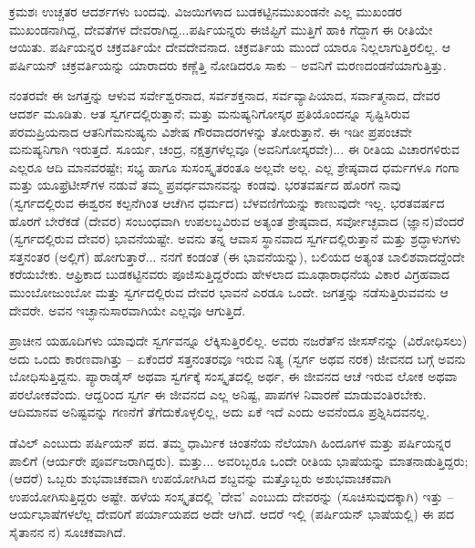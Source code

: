 \vskip 4pt

ಕ್ರಮಶಃ ಉಚ್ಚತರ ಆದರ್ಶಗಳು ಬಂದವು. ವಿಜಯಿಗಳಾದ ಬುಡಕಟ್ಟಿನ\break ಮುಖಂಡನೇ ಎಲ್ಲ ಮುಖಂಡರ ಮುಖಂಡನಾಗಿದ್ದ, ದೇವತೆಗಳ ದೇವರಾಗಿದ್ದ...\break ಪರ್ಷಿಯನ್ನರು ಈಜಿಪ್ಟಿಗೆ ಮುತ್ತಿಗೆ ಹಾಕಿ ಗೆದ್ದಾಗ ಈ ರೀತಿಯೇ ಆಯಿತು. ಪರ್ಷಿಯನ್ನರ ಚಕ್ರವರ್ತಿಯೇ ದೇವದೇವನಾದ. ಚಕ್ರವರ್ತಿಯ ಮುಂದೆ ಯಾರೂ ನಿಲ್ಲಲಾಗುತ್ತಿರಲಿಲ್ಲ. ಆ ಪರ್ಷಿಯನ್ ಚಕ್ರವರ್ತಿಯನ್ನು ಯಾರಾದರು ಕಣ್ಣೆತ್ತಿ ನೋಡಿದರೂ ಸಾಕು – ಅವನಿಗೆ ಮರಣದಂಡನೆಯಾಗುತ್ತಿತ್ತು.

\vskip 4pt

ನಂತರವೇ ಈ ಜಗತ್ತನ್ನು ಆಳುವ ಸರ್ವೇಶ್ವರನಾದ, ಸರ್ವಶಕ್ತನಾದ, ಸರ್ವವ್ಯಾಪಿಯಾದ, ಸರ್ವಾತ್ಮನಾದ, ದೇವರ ಆದರ್ಶ ಮೂಡಿತು. ಆತ ಸ್ವರ್ಗದಲ್ಲಿರುತ್ತಾನೆ; ಮತ್ತು ಮನುಷ್ಯನಿಗೋಸ್ಕರ ಪ್ರತಿಯೊಂದನ್ನೂ ಸೃಷ್ಟಿಸಿರುವ ಪರಮಪ್ರಿಯನಾದ ಆತನಿಗೆ\break ಮನುಷ್ಯನು ವಿಶೇಷ ಗೌರವಾದರಗಳನ್ನು ತೋರುತ್ತಾನೆ. ಈ ಇಡೀ ಪ್ರಪಂಚವೇ ಮನುಷ್ಯನಿಗಾಗಿ ಇರುತ್ತದೆ. ಸೂರ್ಯ, ಚಂದ್ರ, ನಕ್ಷತ್ರಗಳೆಲ್ಲವೂ (ಅವನಿಗೋಸ್ಕರವೇ)... ಈ ರೀತಿಯ ವಿಚಾರಗಳಿರುವ ಎಲ್ಲರೂ ಆದಿ ಮಾನವರಷ್ಟೇ; ಸಭ್ಯ ಹಾಗೂ ಸುಸಂಸ್ಕೃತರಂತೂ ಅಲ್ಲವೇ ಅಲ್ಲ. ಎಲ್ಲ ಶ್ರೇಷ್ಠವಾದ ಧರ್ಮಗಳೂ ಗಂಗಾ ಮತ್ತು ಯೂಫ್ರೆಟೀಸ್‌ಗಳ ನಡುವೆ ತಮ್ಮ ಪ್ರವರ್ಧಮಾನವನ್ನು ಕಂಡವು. ಭರತವರ್ಷದ ಹೊರಗೆ ನಾವು (ಸ್ವರ್ಗದಲ್ಲಿರುವ ಈಶ್ವರನ ಕಲ್ಪನೆಗಿಂತ ಆಚೆಗಿನ ಧರ್ಮದ) ಬೆಳವಣಿಗೆಯನ್ನು ಕಾಣುವುದೇ ಇಲ್ಲ. ಭರತವರ್ಷದ ಹೊರಗೆ ಬೇರೆಕಡೆ (ದೇವರ) ಸಂಬಂಧವಾಗಿ ಉಪಲಬ್ಧವಿರುವ ಅತ್ಯಂತ ಶ್ರೇಷ್ಠವಾದ, ಸರ್ವೋಚ್ಛವಾದ (ಜ್ಞಾನ)ವೆಂದರೆ (ಸ್ವರ್ಗದಲ್ಲಿರುವ ದೇವರ) ಭಾವನೆಯಷ್ಟೇ. ಅವನು ತನ್ನ ಆವಾಸ ಸ್ಥಾನವಾದ ಸ್ವರ್ಗದಲ್ಲಿರುತ್ತಾನೆ ಮತ್ತು ಶ್ರದ್ಧಾಳುಗಳು ಸತ್ತನಂತರ (ಅಲ್ಲಿಗೆ) ಹೋಗುತ್ತಾರೆ... ನನಗೆ ಕಂಡಂತೆ (ಈ ಭಾವನೆಯನ್ನು), ಬಲಿಯದ ಅತ್ಯಂತ ಬಾಲಿಶವಾದದ್ದೆಂದೇ ಕರೆಯಬೇಕು. ಆಫ್ರಿಕಾದ ಬುಡಕಟ್ಟಿನವರು ಪೂಜಿಸುತ್ತಿದ್ದರೆಂದು ಹೇಳಲಾದ ಮೂಢಾರಾಧನೆಯ ವಿಕಾರ ವಿಗ್ರಹವಾದ ಮುಂಬೋಜುಂಬೋ ಮತ್ತು ಸ್ವರ್ಗದಲ್ಲಿರುವ ದೇವರ ಭಾವನೆ ಎರಡೂ ಒಂದೇ. ಜಗತ್ತನ್ನು ನಡೆಸುತ್ತಿರುವವನು ಆ ದೇವರೇ. ಅವನ ಇಚ್ಛಾನುಸಾರವಾಗಿಯೇ ಎಲ್ಲವೂ ಆಗುತ್ತಿದೆ.

\vskip 4pt

ಪ್ರಾಚೀನ ಯಹೂದಿಗಳು ಯಾವುದೇ ಸ್ವರ್ಗವನ್ನೂ ಲೆಕ್ಕಿಸುತ್ತಿರಲಿಲ್ಲ. ಅವರು ನಜರೆತ್‌ನ ಜೀಸಸ್‌ನನ್ನು (ವಿರೋಧಿಸಲು) ಅದು ಒಂದು ಕಾರಣವಾಗಿತ್ತು – ಏಕೆಂದರೆ ಸತ್ತನಂತರವೂ ಇರುವ ನಿತ್ಯ (ಸ್ವರ್ಗ ಅಥವ ನರಕ) ಜೀವನದ ಬಗ್ಗೆ ಅವನು ಬೋಧಿಸುತ್ತಿದ್ದನು. ಪ್ಯಾರಾಡೈಸ್ ಅಥವಾ ಸ್ವರ್ಗಕ್ಕೆ ಸಂಸ್ಕೃತದಲ್ಲಿ ಅರ್ಥ, ಈ ಜೀವನದ ಆಚೆ ಇರುವ ಲೋಕ ಅಥವಾ ಪರಲೋಕವೆಂದು. ಆದ್ದರಿಂದ ಸ್ವರ್ಗ ಈ ಜೀವನದ ಎಲ್ಲ ಅನಿಷ್ಟ, ಪಾಪಗಳ ನಿವಾರಣೆ ಮಾಡುವಂತಿರಬೇಕು. ಆದಿಮಾನವ ಅನಿಷ್ಟವನ್ನು ಗಣನೆಗೆ ತೆಗೆದುಕೊಳ್ಳಲಿಲ್ಲ, ಅದು ಏಕೆ ಇದೆ ಎಂದು ಅವನೆಂದೂ ಪ್ರಶ್ನಿಸಿದವನಲ್ಲ.

\vskip 4pt

ಡೆವಿಲ್ ಎಂಬುದು ಪರ್ಷಿಯನ್ ಪದ. ತಮ್ಮ ಧಾರ್ಮಿಕ ಚಿಂತನೆಯ ನೆಲೆಯಾಗಿ ಹಿಂದೂಗಳ ಮತ್ತು ಪರ್ಷಿಯನ್ನರ ಪಾಲಿಗೆ (ಆರ್ಯರೇ ಪೂರ್ವಜರಾಗಿದ್ದರು). ಮತ್ತು... ಅವರಿಬ್ಬರೂ ಒಂದೇ ರೀತಿಯ ಭಾಷೆಯನ್ನು ಮಾತನಾಡುತ್ತಿದ್ದರು; (ಆದರೆ) ಒಬ್ಬರು ಶುಭವಾಚಕವಾಗಿ ಉಪಯೋಗಿಸಿದ ಶಬ್ದವನ್ನು ಮತ್ತೊಬ್ಬರು ಅಶುಭವಾಚಕವಾಗಿ ಉಪಯೋಗಿಸುತ್ತಿದ್ದರು ಅಷ್ಟೇ. ಹಳೆಯ ಸಂಸ್ಕೃತದಲ್ಲಿ 'ದೇವ' ಎಂಬುದು ದೇವರನ್ನು (ಸೂಚಿಸುವುದಕ್ಕಾಗಿ) ಇತ್ತು – ಆರ್ಯಭಾಷೆಗಳಲೆಲ್ಲ ದೇವರಿಗೆ ಪರ್ಯಾಯಪದ ಅದೇ ಆಗಿದೆ. ಆದರೆ ಇಲ್ಲಿ (ಪರ್ಷಿಯನ್ ಭಾಷೆಯಲ್ಲಿ) ಈ ಪದ ಸೈತಾನನ ನ) ಸೂಚಕವಾಗಿದೆ.

